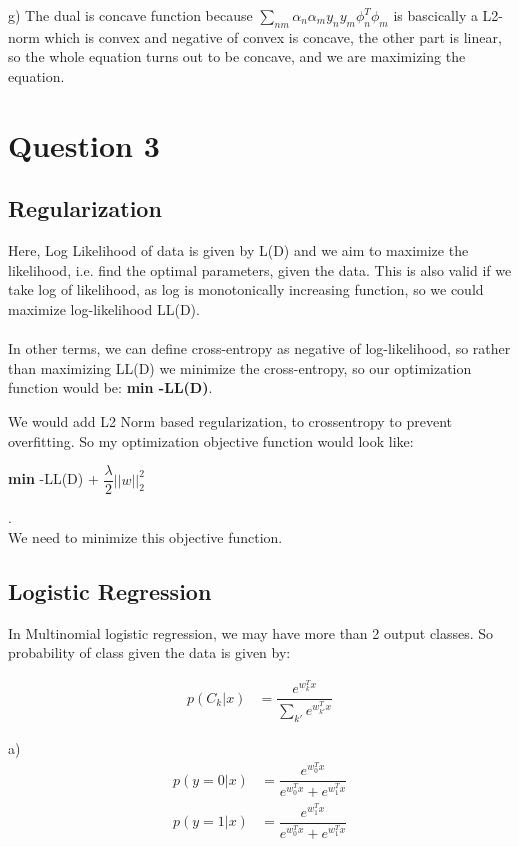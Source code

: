 \documentclass[paper=a4, fontsize=11pt]{scrartcl} %
\numberwithin{equation}{section} %
\numberwithin{figure}{section} %
\numberwithin{table}{section} %
\begin{document}
g) The dual is concave function because $\sum_{nm}\alpha_{n}\alpha_{m}y_{n}y_{m}\phi_{n}^{T}\phi_{m}$ is bascically a L2-norm which is convex and negative of convex is concave, the other part is linear, so the whole equation turns out to be concave, and we are maximizing the equation.


\section{Question 3}
\subsection{Regularization}

Here, Log Likelihood of data is given by L(D) and we aim to maximize the likelihood, i.e. find the optimal parameters, given the data. This is also valid if we take log of likelihood, as log is monotonically increasing function, so we could maximize log-likelihood LL(D).\\\\

In other terms, we can define cross-entropy as negative of log-likelihood, so rather than maximizing LL(D) we minimize the cross-entropy, so our optimization function would be: \textbf{min -LL(D)}.

We would add L2 Norm based regularization, to crossentropy to prevent overfitting. So my optimization objective function would look like:\\
\centerline{\textbf{min} -LL(D) + $\dfrac{\lambda}{2}||w||_{2}^{2}$}.\\
We need to minimize this objective function.


\subsection{Logistic Regression}
In Multinomial logistic regression, we may have more than 2 output classes. So probability of class given the data is given by:

\begin{align*}
p(C_{k}|x) &= \dfrac{e^{w_{k}^{T}x}}{\sum_{k'}e^{w_{k'}^{T}x}} 
\end{align*}

a)
\begin{align*}
p(y=0|x) &= \dfrac{e^{w_{0}^{T}x}}{e^{w_{0}^{T}x} + e^{w_{1}^{T}x}} \\
p(y=1|x) &= \dfrac{e^{w_{1}^{T}x}}{e^{w_{0}^{T}x} + e^{w_{1}^{T}x}} 
\end{align*}
\end{document}
